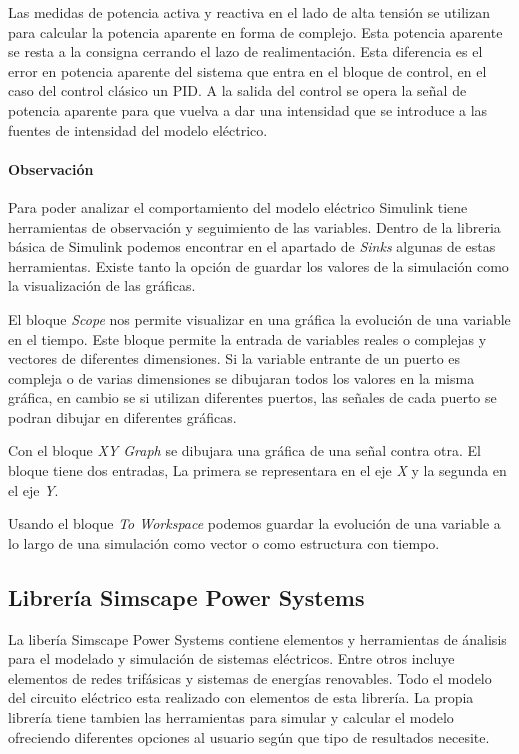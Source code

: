 \documentclass{book}
\begin{document}
Las medidas de potencia activa y reactiva en el lado de alta tensi\'on se utilizan para calcular la potencia aparente en forma de complejo. Esta potencia aparente se resta a la consigna cerrando el lazo de realimentaci\'on. Esta diferencia es el error en potencia aparente del sistema que entra en el bloque de control, en el caso del control cl\'asico un PID. A la salida del control se opera la señal de potencia aparente para que vuelva a dar una intensidad que se introduce a las fuentes de intensidad del modelo el\'ectrico.  \par

		\paragraph{Observaci\'on}
Para poder analizar el comportamiento del modelo el\'ectrico Simulink tiene herramientas de observación y seguimiento de las variables. Dentro de la libreria b\'asica de Simulink podemos encontrar en el apartado de \emph{Sinks} algunas de estas herramientas. Existe tanto la opci\'on de guardar los valores de la simulaci\'on como la visualizaci\'on de las gr\'aficas. \par

El bloque \emph{Scope} nos permite visualizar en una gr\'afica la evoluci\'on de una variable en el tiempo. Este bloque permite la entrada de variables reales o complejas y vectores de diferentes dimensiones. Si la variable entrante de un puerto es compleja o de varias dimensiones se dibujaran todos los valores en la misma gr\'afica, en cambio se si utilizan diferentes puertos, las señales de cada puerto se podran dibujar en diferentes gr\'aficas.  \par

Con el bloque \emph{XY Graph} se dibujara una gr\'afica de una señal contra otra. El bloque tiene dos entradas, La primera se representara en el eje \emph{X} y la segunda en el eje \emph{Y}.  \par

Usando el bloque \emph{To Workspace} podemos guardar la evoluci\'on de una variable a lo largo de una simulaci\'on como vector o como estructura con tiempo.  \par

		\subsection{Librer\'ia Simscape Power Systems}

La liber\'ia Simscape Power Systems contiene elementos y herramientas de \'analisis para el modelado y simulaci\'on de sistemas el\'ectricos. Entre otros incluye elementos de redes trif\'asicas y sistemas de energ\'ias renovables. Todo el modelo del circuito el\'ectrico esta realizado con elementos de esta librer\'ia. La propia librer\'ia tiene tambien las herramientas para simular y calcular el modelo ofreciendo diferentes opciones al usuario seg\'un que tipo de resultados necesite. \par
\end{document}
